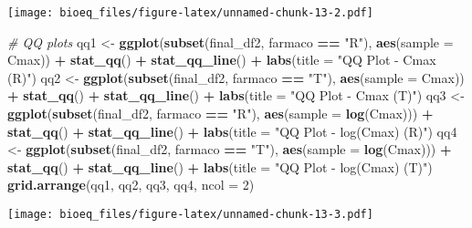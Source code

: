 \documentclass[
]{article}
\newenvironment{Shaded}{\begin{snugshade}}{\end{snugshade}}
\newcommand{\AttributeTok}[1]{\textcolor[rgb]{0.13,0.29,0.53}{#1}}
\newcommand{\CommentTok}[1]{\textcolor[rgb]{0.56,0.35,0.01}{\textit{#1}}}
\newcommand{\DecValTok}[1]{\textcolor[rgb]{0.00,0.00,0.81}{#1}}
\newcommand{\FunctionTok}[1]{\textcolor[rgb]{0.13,0.29,0.53}{\textbf{#1}}}
\newcommand{\NormalTok}[1]{#1}
\newcommand{\OtherTok}[1]{\textcolor[rgb]{0.56,0.35,0.01}{#1}}
\newcommand{\SpecialCharTok}[1]{\textcolor[rgb]{0.81,0.36,0.00}{\textbf{#1}}}
\newcommand{\StringTok}[1]{\textcolor[rgb]{0.31,0.60,0.02}{#1}}
\begin{document}
\texttt{[image: bioeq\_files/figure-latex/unnamed-chunk-13-2.pdf]}

\begin{Shaded}
\begin{Highlighting}[]
\CommentTok{\# QQ plots}
\NormalTok{qq1 }\OtherTok{\textless{}{-}} \FunctionTok{ggplot}\NormalTok{(}\FunctionTok{subset}\NormalTok{(final\_df2, farmaco }\SpecialCharTok{==} \StringTok{"R"}\NormalTok{), }\FunctionTok{aes}\NormalTok{(}\AttributeTok{sample =}\NormalTok{ Cmax)) }\SpecialCharTok{+}
  \FunctionTok{stat\_qq}\NormalTok{() }\SpecialCharTok{+} \FunctionTok{stat\_qq\_line}\NormalTok{() }\SpecialCharTok{+}
  \FunctionTok{labs}\NormalTok{(}\AttributeTok{title =} \StringTok{"QQ Plot {-} Cmax (R)"}\NormalTok{)}
\NormalTok{qq2 }\OtherTok{\textless{}{-}} \FunctionTok{ggplot}\NormalTok{(}\FunctionTok{subset}\NormalTok{(final\_df2, farmaco }\SpecialCharTok{==} \StringTok{"T"}\NormalTok{), }\FunctionTok{aes}\NormalTok{(}\AttributeTok{sample =}\NormalTok{ Cmax)) }\SpecialCharTok{+}
  \FunctionTok{stat\_qq}\NormalTok{() }\SpecialCharTok{+} \FunctionTok{stat\_qq\_line}\NormalTok{() }\SpecialCharTok{+}
  \FunctionTok{labs}\NormalTok{(}\AttributeTok{title =} \StringTok{"QQ Plot {-} Cmax (T)"}\NormalTok{)}
\NormalTok{qq3 }\OtherTok{\textless{}{-}} \FunctionTok{ggplot}\NormalTok{(}\FunctionTok{subset}\NormalTok{(final\_df2, farmaco }\SpecialCharTok{==} \StringTok{"R"}\NormalTok{), }\FunctionTok{aes}\NormalTok{(}\AttributeTok{sample =} \FunctionTok{log}\NormalTok{(Cmax))) }\SpecialCharTok{+}
  \FunctionTok{stat\_qq}\NormalTok{() }\SpecialCharTok{+} \FunctionTok{stat\_qq\_line}\NormalTok{() }\SpecialCharTok{+}
  \FunctionTok{labs}\NormalTok{(}\AttributeTok{title =} \StringTok{"QQ Plot {-} log(Cmax) (R)"}\NormalTok{)}
\NormalTok{qq4 }\OtherTok{\textless{}{-}} \FunctionTok{ggplot}\NormalTok{(}\FunctionTok{subset}\NormalTok{(final\_df2, farmaco }\SpecialCharTok{==} \StringTok{"T"}\NormalTok{), }\FunctionTok{aes}\NormalTok{(}\AttributeTok{sample =} \FunctionTok{log}\NormalTok{(Cmax))) }\SpecialCharTok{+}
  \FunctionTok{stat\_qq}\NormalTok{() }\SpecialCharTok{+} \FunctionTok{stat\_qq\_line}\NormalTok{() }\SpecialCharTok{+}
  \FunctionTok{labs}\NormalTok{(}\AttributeTok{title =} \StringTok{"QQ Plot {-} log(Cmax) (T)"}\NormalTok{)}
\FunctionTok{grid.arrange}\NormalTok{(qq1, qq2, qq3, qq4, }\AttributeTok{ncol =} \DecValTok{2}\NormalTok{)}
\end{Highlighting}
\end{Shaded}

\texttt{[image: bioeq\_files/figure-latex/unnamed-chunk-13-3.pdf]}
\end{document}

